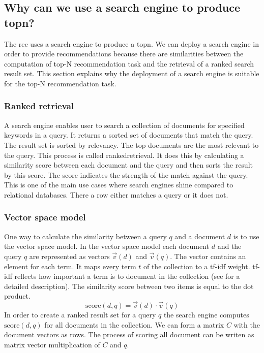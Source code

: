 \subsection{Why can we use a search engine to produce \gls{topn}?}
\label{sec:relation}

The \gls{rec} uses a search engine to produce a \gls{topn}. We can deploy a search engine in order to provide recommendations because there are similarities between the computation of top-N recommendation task and the retrieval of a ranked search result set.
 This section explains why the deployment of a search engine is suitable for the top-N recommendation task.

\subsubsection{Ranked retrieval}
A search engine enables user to search a collection of documents for specified keywords in a query. It returns a sorted set of documents that match the query. The result set is sorted by relevancy. The top documents are the most relevant to the query. This process is called \gls{rankedretrieval}. It does this by calculating a similarity score between each document and the query and then sorts the result by this score. The score indicates the strength of the match against the query. This is one of the main use cases where search engines shine compared to relational databases. There a row either matches a query or it does not. 

\subsubsection{Vector space model}
One way to calculate the similarity between a query $q$ and a document $d$ is to use the vector space model.
In the vector space model each document $d$ and the query $q$ are represented as vectors $\vec{v}(d)$ and $\vec{v}(q)$. The vector contains an element for each term. It maps every term $t$ of the collection to a tf-idf weight. tf-idf reflects how important a term is to document in the collection (see \cite{Manning} for a detailed description). 
The similarity score between two items is equal to the dot product.
\begin{equation}
  \label{eq:score}
  \text{score}(d,q) = \vec{v}(d) \cdot \vec{v}(q)
\end{equation}
In order to create a ranked result set for a query $q$ the search engine computes $\text{score}(d,q)$ for all documents in the collection. We can form a matrix $C$ with the document vectors as rows. The process of scoring all document can be writen as matrix vector multiplication of $C$ and $q$. 

